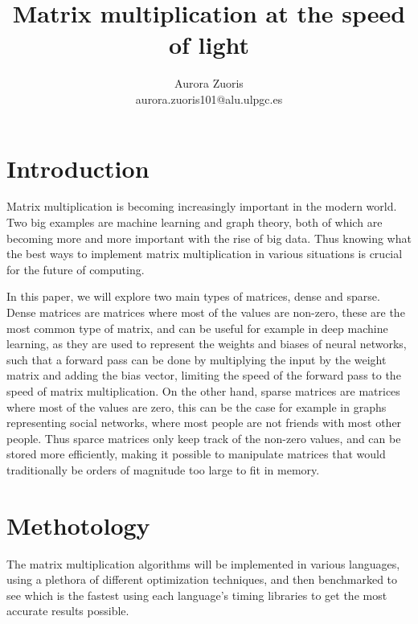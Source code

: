 \documentclass{article}
\author{Aurora Zuoris \\ \normalsize{aurora.zuoris101@alu.ulpgc.es}}
\affil{Universidad de Las Palmas de Gran Canaria}
\title{Matrix multiplication at the speed of light}
\begin{document}
\maketitle


\section{Introduction}

Matrix multiplication is becoming increasingly important in the modern world.
Two big examples are machine learning and graph theory, both of which are
becoming more and more important with the rise of big data.
Thus knowing what the best ways to implement matrix multiplication in
various situations is crucial for the future of computing.

In this paper, we will explore two main types of matrices, dense and sparse.
Dense matrices are matrices where most of the values are non-zero,
these are the most common type of matrix, and can be useful for example in deep machine learning,
as they are used to represent the weights and biases of neural networks, such that
a forward pass can be done by multiplying the input by the weight matrix and adding the bias vector,
limiting the speed of the forward pass to the speed of matrix multiplication.
On the other hand, sparse matrices are matrices where most of the values are zero, this can be the case for example
in graphs representing social networks, where most people are not friends with most other people.
Thus sparce matrices only keep track of the non-zero values, and can be stored more efficiently, making it possible
to manipulate matrices that would traditionally be orders of magnitude too large to fit in memory.

\section{Methotology}

The matrix multiplication algorithms will be implemented in various languages, using a plethora
of different optimization techniques, and then benchmarked to see which is the fastest using each
language's timing libraries to get the most accurate results possible.
\end{document}
